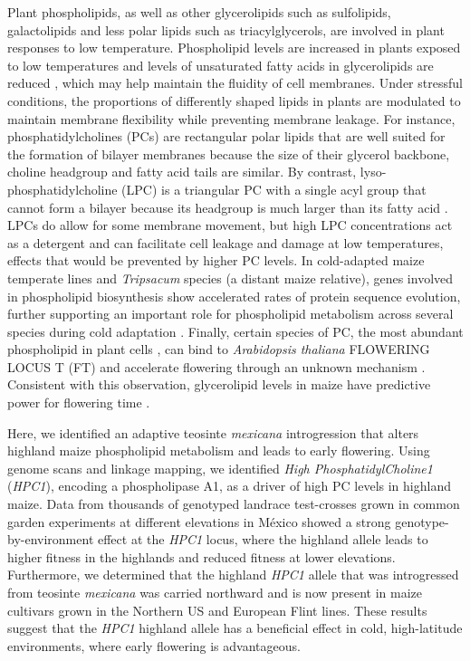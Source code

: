 \documentclass[9pt,twocolumn,twoside,lineno]{biorxiv}
\begin{document}
Plant phospholipids, as well as other glycerolipids such as sulfolipids, galactolipids and less polar lipids such as triacylglycerols, are involved in plant responses to low temperature.
Phospholipid levels are increased in plants exposed to low temperatures \cite{Degenkolbe2012-wf} and levels of unsaturated fatty acids in glycerolipids are reduced \cite{Welti2002-uk, Lynch1987-ln}, which may help maintain the fluidity of cell membranes.
Under stressful conditions, the proportions of differently shaped lipids in plants are modulated to maintain membrane flexibility while preventing membrane leakage. 
For instance, phosphatidylcholines (PCs) are rectangular polar lipids that are well suited for the formation of bilayer membranes because the size of their glycerol backbone, choline headgroup and fatty acid tails are similar.
By contrast, lyso-phosphatidylcholine (LPC) is a triangular PC with a single acyl group that cannot form a bilayer because its headgroup is much larger than its fatty acid \cite{Jouhet2013-fv}.
LPCs do allow for some membrane movement, but high LPC concentrations act as a detergent \cite{Henriksen2010-cm} and can facilitate cell leakage and damage at low temperatures, effects that would be prevented by higher PC levels.
In cold-adapted maize temperate lines and \textit{Tripsacum} species (a distant maize relative), genes involved in  phospholipid biosynthesis show accelerated rates of protein sequence evolution, further supporting an important role for phospholipid metabolism across several species during cold adaptation \cite{Yan2019-tx}. 
Finally, certain species of PC, the most abundant phospholipid  in plant cells \cite{Gu2017-nd}, can bind to \textit{Arabidopsis thaliana} FLOWERING LOCUS T (FT) and accelerate flowering through an unknown mechanism \cite{Nakamura2014-qf}. 
Consistent with this observation, glycerolipid levels in maize have predictive power for flowering time \cite{Riedelsheimer2013-bd}. 

Here, we identified an adaptive teosinte \textit{mexicana} introgression that alters highland maize phospholipid metabolism and leads to early flowering.
Using genome scans and linkage mapping, we identified \textit{High PhosphatidylCholine1} (\textit{HPC1}), encoding a phospholipase A1, as a driver of high PC levels in highland maize. 
Data from thousands of genotyped landrace test-crosses grown in common garden experiments at different elevations in México showed a strong genotype-by-environment effect at the \textit{HPC1} locus, where the highland allele leads to higher fitness in the highlands and reduced fitness at lower elevations.
Furthermore, we determined that the highland \textit{HPC1} allele that was introgressed from teosinte \textit{mexicana} was carried northward and is now present in maize cultivars grown in the Northern US and European Flint lines.
These results suggest that the \textit{HPC1} highland allele has a beneficial effect in cold, high-latitude environments, where early flowering is advantageous.
\end{document}
